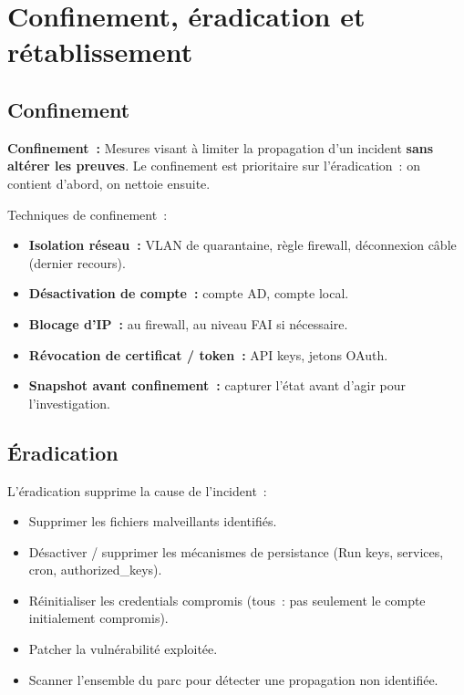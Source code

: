 \section{Confinement, éradication et rétablissement}
\label{sec:cir}

\subsection{Confinement}

\begin{boxdef}
\textbf{Confinement~:} Mesures visant à limiter la propagation d'un incident
\textbf{sans altérer les preuves}. Le confinement est prioritaire sur
l'éradication~: on contient d'abord, on nettoie ensuite.
\end{boxdef}

Techniques de confinement~:
\begin{itemize}
  \item \textbf{Isolation réseau~:} VLAN de quarantaine, règle firewall,
        déconnexion câble (dernier recours).
  \item \textbf{Désactivation de compte~:} compte AD, compte local.
  \item \textbf{Blocage d'IP~:} au firewall, au niveau FAI si nécessaire.
  \item \textbf{Révocation de certificat / token~:} API keys, jetons OAuth.
  \item \textbf{Snapshot avant confinement~:} capturer l'état avant
        d'agir pour l'investigation.
\end{itemize}

\subsection{Éradication}

L'éradication supprime la cause de l'incident~:
\begin{itemize}
  \item Supprimer les fichiers malveillants identifiés.
  \item Désactiver / supprimer les mécanismes de persistance
        (Run keys, services, cron, authorized\_keys).
  \item Réinitialiser les credentials compromis (tous~: pas seulement
        le compte initialement compromis).
  \item Patcher la vulnérabilité exploitée.
  \item Scanner l'ensemble du parc pour détecter une propagation
        non identifiée.
\end{itemize}

